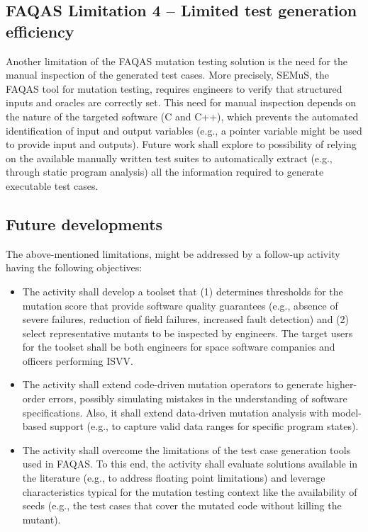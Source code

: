 \subsection{FAQAS Limitation 4 – Limited test generation efficiency}

Another limitation of the FAQAS mutation testing solution is the need for the manual inspection of the generated test cases. More precisely, SEMuS, the FAQAS tool for mutation testing, requires engineers to verify that structured inputs and oracles are correctly set. This need for manual inspection depends on the nature of the targeted software (C and C++), which prevents the automated identification of input and output variables (e.g., a pointer variable might be used to provide input and outputs). Future work shall explore to possibility of relying on the available manually written test suites to automatically extract (e.g., through static program analysis) all the information required to generate executable test cases.

\subsection{Future developments}

The above-mentioned limitations, might be addressed by a follow-up activity having the following objectives:

\begin{itemize}
\item {}
The activity shall develop a toolset that (1) determines thresholds for the mutation score that provide software quality guarantees (e.g., absence of severe failures, reduction of field failures, increased fault detection) and (2) select representative mutants to be inspected by engineers. The target users for the toolset shall be both engineers for space software companies and officers performing ISVV.

\item {} The activity shall extend code-driven mutation operators to generate higher-order errors, possibly simulating mistakes in the understanding of software specifications. Also, it shall extend data-driven mutation analysis with model-based support (e.g., to capture valid data ranges for specific program states).

\item {} The activity shall overcome the limitations of the test case generation tools used in FAQAS. To this end, the activity shall evaluate solutions available in the literature (e.g., to address floating point limitations) and leverage characteristics typical for the mutation testing context like the availability of seeds (e.g., the test cases that cover the mutated code without killing the mutant).

\end{itemize}

\ENDCHANGEDWPT
